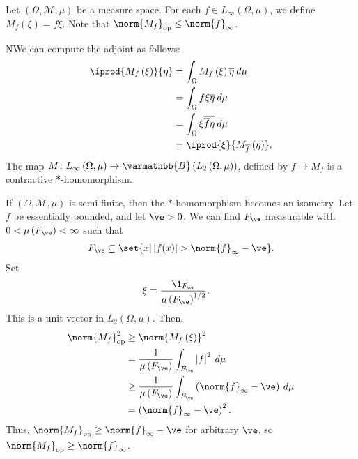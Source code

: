 \documentclass[10pt]{mypackage}
\renewcommand*{\mathbb}[1]{\varmathbb{#1}}
\newcommand{\B}{\mathbb{B}}
\begin{document}
\begin{example}
  Let $\left(\Omega,\mathcal{M},\mu\right)$ be a measure space. For each $f\in L_{\infty}\left(\Omega,\mu\right)$, we define $M_{f}\left(\xi\right) = f\xi$. Note that $\norm{M_f}_{\text{op}} \leq \norm{f}_{\infty}$.\newline

  NWe can compute the adjoint as follows:
  \begin{align*}
    \iprod{M_{f}\left(\xi\right)}{\eta} &= \int_{\Omega}^{} M_f\left(\xi\right) \overline{\eta}\:d\mu\\
                                        &= \int_{\Omega}^{} f\xi \overline{\eta}\:d\mu\\
                                        &= \int_{\Omega}^{} \xi \overline{\overline{f}\eta}\:d\mu\\
                                        &= \iprod{\xi}{M_{\overline{f}}\left(\eta\right)}.
  \end{align*}
  The map $M\colon L_{\infty}\left(\Omega,\mu\right)\rightarrow \B\left(L_{2}\left(\Omega,\mu\right)\right)$, defined by $f\mapsto M_f$ is a contractive $\ast$-homomorphism.\newline

  If $\left(\Omega,\mathcal{M},\mu\right)$ is semi-finite, then the $\ast$-homomorphism becomes an isometry. Let $f$ be essentially bounded, and let $\ve > 0$. We can find $F_\ve$ measurable with $0 < \mu\left(F_{\ve}\right) < \infty$ such that
  \begin{align*}
    F_{\ve} \subseteq \set{x | \left\vert f(x)  \right\vert > \norm{f}_{\infty} - \ve}.
  \end{align*}
  Set 
  \begin{align*}
    \xi &= \frac{\1_{F_{\ve}}}{\mu\left(F_{\ve}\right)^{1/2}}.
  \end{align*}
  This is a unit vector in $L_2\left(\Omega,\mu\right)$. Then,
  \begin{align*}
    \norm{M_f}_{\text{op}}^2 &\geq \norm{M_f\left(\xi\right)}^2\\
                             &= \frac{1}{\mu\left(F_{\ve}\right)} \int_{F_{\ve}}^{} \left\vert f \right\vert^2\:d\mu\\
                             &\geq \frac{1}{\mu\left(F_{\ve}\right)}\int_{F_{\ve}}^{} \left(\norm{f}_{\infty} - \ve\right)\:d\mu\\
                             &= \left(\norm{f}_{\infty}- \ve\right)^2.
  \end{align*}
  Thus, $\norm{M_f}_{\text{op}} \geq \norm{f}_{\infty} - \ve$ for arbitrary $\ve$, so $\norm{M_f}_{\text{op}} \geq \norm{f}_{\infty}$.
\end{example}
\end{document}
